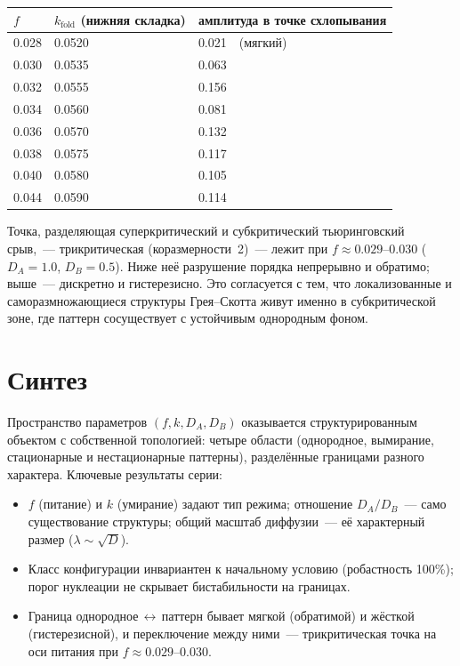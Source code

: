 \documentclass[11pt]{article}
\newcommand{\hruleline}{\vspace{-2pt}{\color{acrule}\hrule height 0.6pt}\vspace{6pt}}
\begin{document}
\begin{center}\small
\begin{tabular}{@{}lll@{}}
\toprule
$f$ & $k_{\text{fold}}$ (нижняя складка) & амплитуда в точке схлопывания \\ \midrule
0.028 & 0.0520 & 0.021\ \ (мягкий) \\
0.030 & 0.0535 & 0.063 \\
0.032 & 0.0555 & 0.156 \\
0.034 & 0.0560 & 0.081 \\
0.036 & 0.0570 & 0.132 \\
0.038 & 0.0575 & 0.117 \\
0.040 & 0.0580 & 0.105 \\
0.044 & 0.0590 & 0.114 \\ \bottomrule
\end{tabular}
\end{center}

\vspace{4mm}
Точка, разделяющая суперкритический и субкритический тьюринговский срыв,~— трикритическая
(коразмерности~2)~— лежит при $f\approx0.029\text{--}0.030$ ($D_A=1.0$, $D_B=0.5$). Ниже неё разрушение
порядка непрерывно и обратимо; выше~— дискретно и гистерезисно. Это согласуется с тем, что
локализованные и саморазмножающиеся структуры Грея–Скотта живут именно в субкритической зоне, где
паттерн сосуществует с устойчивым однородным фоном.
\clearpage

\section{Синтез}
\hruleline
Пространство параметров $(f,k,D_A,D_B)$ оказывается структурированным объектом с собственной
топологией: четыре области (однородное, вымирание, стационарные и нестационарные паттерны),
разделённые границами разного характера. Ключевые результаты серии:

\begin{itemize}\itemsep2pt
\item $f$ (питание) и $k$ (умирание) задают тип режима; отношение $D_A/D_B$~— само существование
структуры; общий масштаб диффузии~— её характерный размер ($\lambda\sim\sqrt{D}$).
\item Класс конфигурации инвариантен к начальному условию (робастность 100\%); порог нуклеации не
скрывает бистабильности на границах.
\item Граница однородное\,$\leftrightarrow$\,паттерн бывает мягкой (обратимой) и жёсткой
(гистерезисной), и переключение между ними~— трикритическая точка на оси питания при
$f\approx0.029\text{--}0.030$.
\end{itemize}
\end{document}
